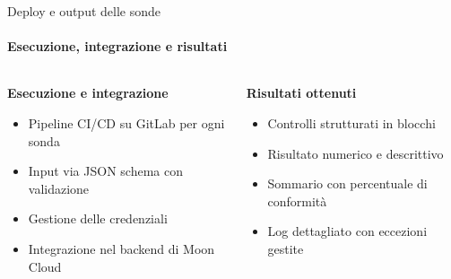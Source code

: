 \documentclass{beamer}
\begin{document}
\begin{frame}{Deploy e output delle sonde}
    \framesubtitle{Esecuzione, integrazione e risultati}
    \begin{columns}
        \begin{column}{0.5\textwidth}
            \textbf{Esecuzione e integrazione}
            \begin{itemize}
                \item Pipeline CI/CD su GitLab per ogni sonda
                \item Input via JSON schema con validazione
                \item Gestione delle credenziali
                \item Integrazione nel backend di Moon Cloud
            \end{itemize}
        \end{column}
        \begin{column}{0.5\textwidth}
            \textbf{Risultati ottenuti}
            \begin{itemize}
                \item Controlli strutturati in blocchi
                \item Risultato numerico e descrittivo
                \item Sommario con percentuale di conformità
                \item Log dettagliato con eccezioni gestite
            \end{itemize}
        \end{column}
    \end{columns}
\end{frame}
\end{document}
